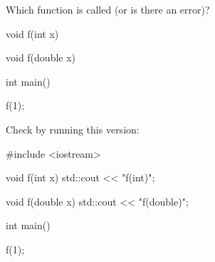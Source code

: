 Which function is called (or is there an error)?



\begin{consolethree}[escapeinside=||]

void f(int x) {}

void f(double x) {}



int main()

{

    f(1);

}

\end{consolethree}



Check by running this version:



\begin{consolethree}[escapeinside=||]

#include <iostream>



void f(int x) { std::cout << "f(int)\n"; }

void f(double x) { std::cout << "f(double)\n"; }



int main()

{

    f(1);

}

\end{consolethree}

